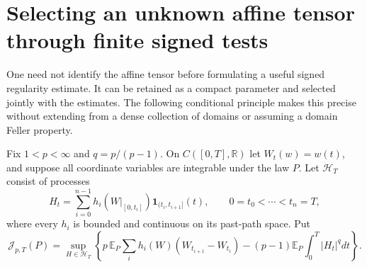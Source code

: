 \documentclass[11pt]{article}
\theoremstyle{definition}\newtheorem{definition}[theorem]{Definition}
\theoremstyle{remark}\newtheorem{remark}[theorem]{Remark}
\begin{document}
\section{Selecting an unknown affine tensor through finite signed tests}
\label{sec:finite-affine-energy-selection}

One need not identify the affine tensor before formulating a useful
signed regularity estimate. It can be retained as a compact parameter
and selected jointly with the estimates. The following conditional
principle makes this precise without extending from a dense collection
of domains or assuming a domain Feller property.

Fix $1<p<\infty$ and $q=p/(p-1)$. On $C([0,T],\mathbb R)$ let
$W_t(w)=w(t)$, and suppose all coordinate variables are integrable
under the law $P$. Let $\mathcal H_T$ consist of processes
\[
 H_t=\sum_{i=0}^{n-1}h_i(W|_{[0,t_i]})
                       \mathbf1_{(t_i,t_{i+1}]}(t),
 \qquad 0=t_0<\cdots<t_n=T,
\]
where every $h_i$ is bounded and continuous on its past-path space.
Put
\[
 \mathcal J_{p,T}(P)=\sup_{H\in\mathcal H_T}
 \left\{p\,\mathbb E_P\sum_i h_i(W)(W_{t_{i+1}}-W_{t_i})
       -(p-1)\mathbb E_P\int_0^T|H_t|^qdt\right\}.
 \tag{FS1}
\]
\end{document}
